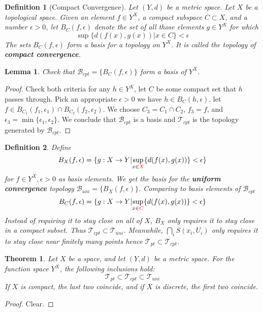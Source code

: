 \documentclass[article,11pt, reqno]{article}
\newtheorem*{theorem}{Theorem}
\newtheorem*{lemma}{Lemma}
\newtheorem*{definition}{Definition}
\theoremstyle{remark}
\newcommand{\mc}{\mathcal}
\newcommand{\ra}{\rightarrow}
\newcommand{\<}{\langle}
\renewcommand{\>}{\rangle}
\newcommand*\circled[1]{\tikz[baseline=(char.base)]{
            \node[shape=circle,draw,inner sep=0.5pt] (char) {#1};}}
\begin{document}
\begin{definition}[Compact Convergence]
    Let $(Y,d)$ be a metric space. Let $X$ be a topological space. Given an element $f\in Y^X$, a compact subspace $C\subset X$, and a number $\epsilon > 0$, let $B_C(f,\epsilon)$ denote the set of all those elements $g\in Y^X$ for which
    $$
        \sup\{d( f (x), g(x)) | x\in C\} < \epsilon
    $$
    The sets $B_C ( f, \epsilon)$ form a basis for a topology on $Y^X$. It is called the topology of \textbf{compact convergence}.
\end{definition}
\begin{lemma}
    Check that $\mc B_{cpt}=\{B_C(f,\epsilon)\}$ form a basis of $Y^X$.
\end{lemma}
\begin{proof}
    Check both criteria \circled{1} for any $h\in Y^X$, let $C$ be some compact set that $h$ passes through. Pick an appropriate $\epsilon>0$ we have $h\in B_C(h,\epsilon)$. \circled{2} let $f\in B_{C_1}(f_1,\epsilon_1)\cap B_{C_2}(f_2,\epsilon_2)$. We choose $C_3=C_1\cap C_2$, $f_3=f$, and $\epsilon_3= \min\{\epsilon_1,\epsilon_2\}$. We conclude that $\mc B_{cpt}$ is a basis and $\mc T_{cpt}$ is the topology generated by $\mc B_{cpt}$.
\end{proof}
\begin{definition}
    Define 
    $$
        B_X(f,\epsilon)=\{g:X\ra Y|\underset{x\in \textcolor{red}{X}}{\sup}\{d(f(x),g(x))\}<\epsilon\}
    $$
    for $f\in Y^X,\epsilon>0$ as basis elements. We get the basis for the \textbf{uniform convergence} topology $\mc B_{uni}=\{B_X(f,\epsilon)\}$. Comparing to basis elements of $\mc B_{cpt}$
    $$
        B_C(f,\epsilon)=\{g:X\ra Y|\underset{x\in \textcolor{red}{C}}{\sup}\{d(f(x),g(x))\}<\epsilon\}
    $$
    Instead of requiring it to stay close on all of $X$, $B_X$ only requires it to stay close in a compact subset. Thus $\mc T_{cpt} \subset\mc T_{uni}$. Meanwhile, $\bigcap_i S(x_i,U_i)$ only requires it to stay close near finitely many points hence $\mc T_{pt} \subset\mc T_{cpt}$.
\end{definition}
\begin{theorem}
    Let $X$ be a space, and let $(Y,d)$ be a metric space. For the function space $Y^X$, the following inclusions hold:
    $$
        \mc T_{pt} \subset\mc T_{cpt}\subset\mc T_{uni}
    $$
    If $X$ is compact, the last two coincide, and if $X$ is discrete, the first two coincide.
\end{theorem}
\begin{proof}
    Clear.
\end{proof}
\end{document}
